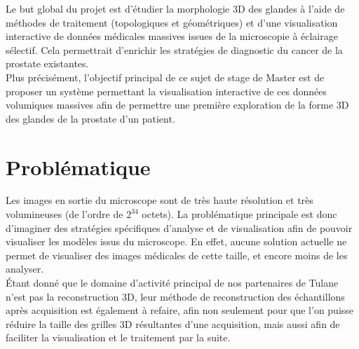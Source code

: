 \documentclass[utf8]{stageM2R}
\begin{document}
{{			Le but global du projet est d’étudier la morphologie 3D des glandes à l'aide de méthodes de traitement (topologiques et géométriques) et d’une visualisation interactive de données médicales massives issues de la microscopie à éclairage sélectif. Cela permettrait d’enrichir les stratégies de diagnostic du cancer de la prostate existantes.\\

			Plus précisément, l'objectif principal de ce sujet de stage de Master est de proposer un système permettant la visualisation interactive de ces données volumiques massives afin de permettre une première exploration de la forme 3D des glandes de la prostate d'un patient.
		}
		\section{Problématique}\label{section:01_02_problematique}
		{
			Les images en sortie du microscope sont de très haute résolution et très volumineuses (de l'ordre de $2^{34}$ octets). La problématique principale est donc d'imaginer des stratégies spécifiques d’analyse et de visualisation afin de pouvoir visualiser les modèles issus du microscope. En effet, aucune solution actuelle ne permet de visualiser des images médicales de cette taille, et encore moins de les analyser.\\

			Étant donné que le domaine d'activité principal de nos partenaires de Tulane n'est pas la reconstruction 3D, leur méthode de reconstruction des échantillons après acquisition est également à refaire, afin non seulement pour que l'on puisse réduire la taille des grilles 3D résultantes d'une acquisition, mais aussi afin de faciliter la visualisation et le traitement par la suite.
		}
	}
\end{document}

